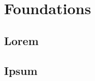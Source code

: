 \documentclass[oneside,11pt]{memoir}
\begin{document}

\part{Foundations}



\chapter{Lorem}

\cite{arxiv-1907.07174}

\lipsum[1-3]

\chapter{Ipsum}

\end{document}
